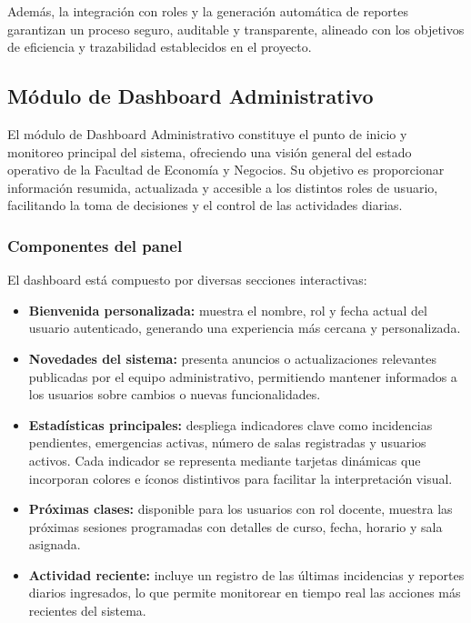 Además, la integración con roles y la generación automática de reportes garantizan un proceso seguro, auditable y transparente, alineado con los objetivos de eficiencia y trazabilidad establecidos en el proyecto.

\subsection{Módulo de Dashboard Administrativo}

El módulo de Dashboard Administrativo constituye el punto de inicio y monitoreo principal del sistema, ofreciendo una visión general del estado operativo de la Facultad de Economía y Negocios. Su objetivo es proporcionar información resumida, actualizada y accesible a los distintos roles de usuario, facilitando la toma de decisiones y el control de las actividades diarias.

\subsubsection{Componentes del panel}

El dashboard está compuesto por diversas secciones interactivas:

\begin{itemize}
    \item \textbf{Bienvenida personalizada:} muestra el nombre, rol y fecha actual del usuario autenticado, generando una experiencia más cercana y personalizada.
    
    \item \textbf{Novedades del sistema:} presenta anuncios o actualizaciones relevantes publicadas por el equipo administrativo, permitiendo mantener informados a los usuarios sobre cambios o nuevas funcionalidades.
    
    \item \textbf{Estadísticas principales:} despliega indicadores clave como incidencias pendientes, emergencias activas, número de salas registradas y usuarios activos. Cada indicador se representa mediante tarjetas dinámicas que incorporan colores e íconos distintivos para facilitar la interpretación visual.
    
    \item \textbf{Próximas clases:} disponible para los usuarios con rol docente, muestra las próximas sesiones programadas con detalles de curso, fecha, horario y sala asignada.
    
    \item \textbf{Actividad reciente:} incluye un registro de las últimas incidencias y reportes diarios ingresados, lo que permite monitorear en tiempo real las acciones más recientes del sistema.
\end{itemize}

